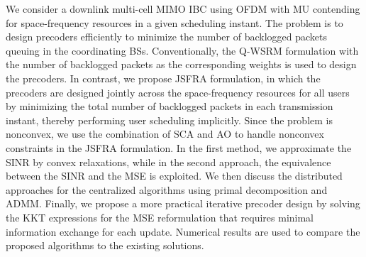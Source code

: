 We consider a downlink multi-cell \ac{MIMO} \ac{IBC} using \ac{OFDM} with \acl{MU} contending for space-frequency resources in a given scheduling instant. The problem is to design precoders efficiently to minimize the number of backlogged packets queuing in the coordinating \acp{BS}. Conventionally, the \ac{Q-WSRM} formulation with the number of backlogged packets as the corresponding weights is used to design the precoders. In contrast, we propose \ac{JSFRA} formulation, in which the precoders are designed jointly across the space-frequency resources for all users by minimizing the total number of backlogged packets in each transmission instant, thereby performing user scheduling implicitly. Since the problem is nonconvex, we use the combination of \ac{SCA} and \ac{AO} to handle nonconvex constraints in the \ac{JSFRA} formulation. In the first method, we approximate the \ac{SINR} by convex relaxations, while in the second approach, the equivalence between the \ac{SINR} and the \ac{MSE} is exploited. We then discuss the distributed approaches for the centralized algorithms using primal decomposition and \acl{ADMM}. Finally, we propose a more practical iterative precoder design by solving the \acl{KKT} expressions for the \ac{MSE} reformulation that requires minimal information exchange for each update. Numerical results are used to compare the proposed algorithms to the existing solutions.
